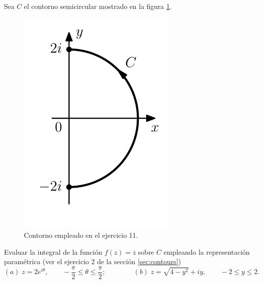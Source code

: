 \documentclass[a4paper]{report}
\begin{document}
Sea \(C\) el contorno semicircular mostrado en la figura \ref{fig:exercise_46_11}. 
\begin{figure}[!htb]
 \begin{minipage}[c]{0.24\textwidth}
  \includegraphics[width=\textwidth]{figuras/exercise_46_11.pdf}
 \end{minipage}\hfill
 \begin{minipage}[c]{0.66\textwidth}
  \caption{
    Contorno empleado en el ejercicio 11.
    }\label{fig:exercise_46_11}
 \end{minipage}
\end{figure}
Evaluar la integral de la función \(f(z)=\overline{z}\) sobre \(C\) empleando la representación paramétrica (ver el ejercicio 2 de la sección \ref{sec:contours})
\[
 (\textit{a})\;z=2e^{i\theta},\qquad-\frac{\pi}{2}\leq\theta\leq\frac{\pi}{2};\qquad\qquad (\textit{b})\;z=\sqrt{4-y^2}+iy,\qquad-2\leq y\leq2.
\]
\end{document}
